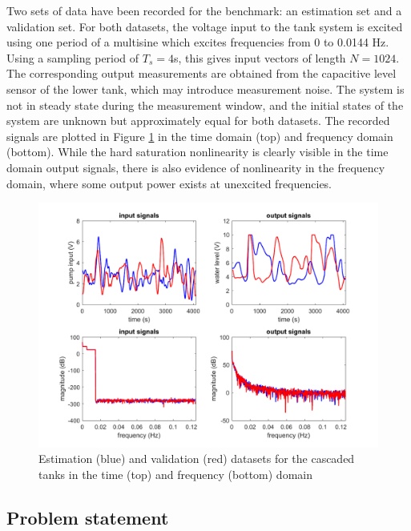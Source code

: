 Two sets of data have been recorded for the benchmark: an estimation set and a validation set. For both datasets, the voltage input to the tank system is excited using one period of a multisine which excites frequencies from 0 to 0.0144 Hz. Using a sampling period of $T_s=4$s, this gives input vectors of length $N=1024$. The corresponding output measurements are obtained from the capacitive level sensor of the lower tank, which may introduce measurement noise. The system is not in steady state during the measurement window, and the initial states of the system are unknown but approximately equal for both datasets. The recorded signals are plotted in Figure \ref{fig:datasets_tanks} in the time domain (top) and frequency domain (bottom). While the hard saturation nonlinearity is clearly visible in the time domain output signals, there is also evidence of nonlinearity in the frequency domain, where some output power exists at unexcited frequencies.

\begin{figure}[h]
\centering
\includegraphics[width=1.05\textwidth]{Chapter6_CaseStudies/Datasets_tanks.pdf}
\caption{Estimation (blue) and validation (red) datasets for the cascaded tanks in the time (top) and frequency (bottom) domain}
\label{fig:datasets_tanks}
\end{figure}

\subsection{Problem statement}

